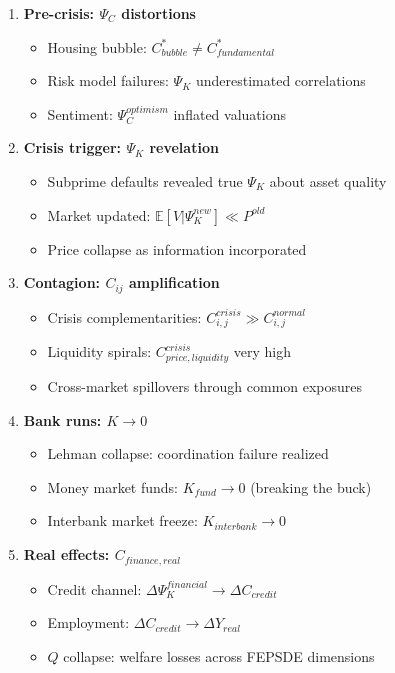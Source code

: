 \begin{enumerate}
\item \textbf{Pre-crisis: $\Psi_C$ distortions}
    \begin{itemize}
    \item Housing bubble: $C^*_{bubble} \neq C^*_{fundamental}$
    \item Risk model failures: $\Psi_K$ underestimated correlations
    \item Sentiment: $\Psi_C^{optimism}$ inflated valuations
    \end{itemize}

\item \textbf{Crisis trigger: $\Psi_K$ revelation}
    \begin{itemize}
    \item Subprime defaults revealed true $\Psi_K$ about asset quality
    \item Market updated: $\mathbb{E}[V | \Psi_K^{new}] \ll P^{old}$
    \item Price collapse as information incorporated
    \end{itemize}

\item \textbf{Contagion: $C_{ij}$ amplification}
    \begin{itemize}
    \item Crisis complementarities: $C_{i,j}^{crisis} \gg C_{i,j}^{normal}$
    \item Liquidity spirals: $C_{price, liquidity}^{crisis}$ very high
    \item Cross-market spillovers through common exposures
    \end{itemize}

\item \textbf{Bank runs: $K \to 0$}
    \begin{itemize}
    \item Lehman collapse: coordination failure realized
    \item Money market funds: $K_{fund} \to 0$ (breaking the buck)
    \item Interbank market freeze: $K_{interbank} \to 0$
    \end{itemize}

\item \textbf{Real effects: $C_{finance, real}$}
    \begin{itemize}
    \item Credit channel: $\Delta \Psi_K^{financial} \to \Delta C_{credit}$
    \item Employment: $\Delta C_{credit} \to \Delta Y_{real}$
    \item $Q$ collapse: welfare losses across FEPSDE dimensions
    \end{itemize}
\end{enumerate}

